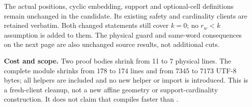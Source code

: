 The actual positions, cyclic embedding, support and optional-cell definitions remain unchanged in the candidate. Its existing safety and cardinality clients are retained verbatim. Both changed statements still cover $k=0$; no $r_w<k$ assumption is added to them. The physical guard and same-word consequences on the next page are also unchanged source results, not additional cuts.

\textbf{Cost and scope.} Two proof bodies shrink from 11 to 7 physical lines. The complete module shrinks from 178 to 174 lines and from 7345 to 7173 UTF-8 bytes; all helpers are included and no new helper or import is introduced. This is a fresh-client cleanup, not a new affine geometry or support-cardinality construction. It does not claim that  compiles faster than .
